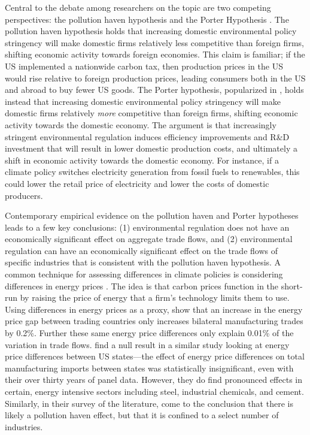 Central to the debate among researchers on the topic are two competing perspectives: the pollution haven hypothesis and the Porter Hypothesis \citep{dechezlepretre2020impacts}. The pollution haven hypothesis holds that increasing domestic environmental policy stringency will make domestic firms relatively less competitive than foreign firms, shifting economic activity towards foreign economies. This claim is familiar; if the US implemented a nationwide carbon tax, then production prices in the US would rise relative to foreign production prices, leading consumers both in the US and abroad to buy fewer US goods. The Porter hypothesis, popularized in \cite{porter1995toward}, holds instead that increasing domestic environmental policy stringency will make domestic firms relatively \emph{more} competitive than foreign firms, shifting economic activity towards the domestic economy. The argument is that increasingly stringent environmental regulation induces efficiency improvements and R\&D investment that will result in lower domestic production costs, and ultimately a shift in economic activity towards the domestic economy. For instance, if a climate policy switches electricity generation from fossil fuels to renewables, this could lower the retail price of electricity and lower the costs of domestic producers. 

Contemporary empirical evidence on the pollution haven and Porter hypotheses leads to a few key conclusions: (1) environmental regulation does not have an economically significant effect on aggregate trade flows, and (2) environmental regulation can have an economically significant effect on the trade flows of specific industries that is consistent with the pollution haven hypothesis. A common technique for assessing differences in climate policies is considering differences in energy prices \citep[see for example][]{fowlie2022mitigating}. The idea is that carbon prices function in the short-run by raising the price of energy that a firm's technology limits them to use. Using differences in energy prices as a proxy, \cite{sato2015asymmetric} show that an increase in the energy price gap between trading countries only increases bilateral manufacturing trades by 0.2\%. Further these same energy price differences only explain 0.01\% of the variation in trade flows. \cite{aldy2015competitiveness} find a null result in a similar study looking at energy price differences between US states---the effect of energy price differences on total manufacturing imports between states was statistically insignificant, even with their over thirty years of panel data. However, they do find pronounced effects in certain, energy intensive sectors including steel, industrial chemicals, and cement. Similarly, in their survey of the literature, \cite{dechezlepretre2020impacts} come to the conclusion that there is likely a pollution haven effect, but that it is confined to a select number of industries.


